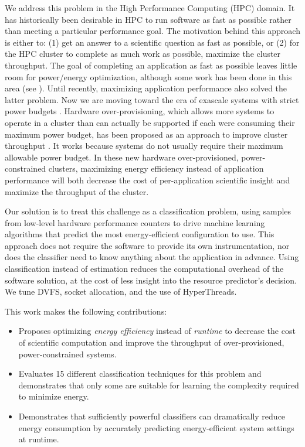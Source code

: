 We address this problem in the High Performance Computing (HPC) domain.
It has historically been desirable in HPC to run software as fast as possible rather than meeting a particular performance goal.
The motivation behind this approach is either to: (1) get an answer to a scientific question as fast as possible, or (2) for the HPC cluster to complete as much work as possible, \ie maximize the cluster throughput.
The goal of completing an application as fast as possible leaves little room for power/energy optimization, although some work has been done in this area (see ).
Until recently, maximizing application performance also solved the latter problem.
Now we are moving toward the era of exascale systems with strict power budgets \cite{Exascale20MW}.
Hardware over-provisioning, which allows more systems to operate in a cluster than can actually be supported if each were consuming their maximum power budget, has been proposed as an approach to improve cluster throughput \cite{PatkiRMAP}.
It works because systems do not usually require their maximum allowable power budget.
In these new hardware over-provisioned, power-constrained clusters, maximizing energy efficiency instead of application performance will both decrease the cost of per-application scientific insight and maximize the throughput of the cluster.

Our solution is to treat this challenge as a classification problem, using samples from low-level hardware performance counters to drive machine learning algorithms that predict the most energy-efficient configuration to use.
This approach does not require the software to provide its own instrumentation, nor does the classifier need to know anything about the application in advance.
Using classification instead of estimation reduces the computational overhead of the software solution, at the cost of less insight into the resource predictor's decision.
We tune DVFS, socket allocation, and the use of HyperThreads.

This work makes the following contributions:
\begin{itemize}
\item Proposes optimizing \emph{energy efficiency} instead of \emph{runtime} to decrease the cost of scientific computation and improve the throughput of over-provisioned, power-constrained systems.
\item Evaluates 15 different classification techniques for this problem and demonstrates that only some are suitable for learning the complexity required to minimize energy.
\item Demonstrates that sufficiently powerful classifiers can dramatically reduce energy consumption by accurately predicting energy-efficient system settings at runtime.
\end{itemize}
